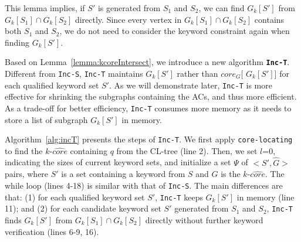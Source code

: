 This lemma implies, if $S'$ is generated from $S_1$ and $S_2$,
we can find $G_k[S']$ from $G_k[S_1]\cap G_k[S_2]$ directly.
Since every vertex in $G_k[S_1]\cap G_k[S_2]$ contains both $S_1$ and $S_2$,
we do not need to consider the keyword constraint again when finding $G_k[S']$.

Based on Lemma~\ref{lemma:kcoreIntersect}, we introduce a new algorithm \textbf{{\tt Inc-T}}. Different from {\tt Inc-S}, {\tt Inc-T} maintains $G_k[S']$ rather than $core_G[$ $G_k[S']]$ for each qualified keyword set $S'$. As we will demonstrate later, {\tt Inc-T} is more effective for shrinking the subgraphs containing the ACs, and thus more efficient. As a trade-off for better efficiency, {\tt Inc-T} consumes more memory as it needs to store a list of subgraph $G_k[S']$ in memory.


Algorithm~\ref{alg:incT} presents the steps of {\tt Inc-T}.
We first apply {\tt core-locating} to find the $k$-$\widehat{core}$ containing $q$ from the CL-tree (line 2).
Then, we set $l$=0, indicating the sizes of current keyword sets,
and initialize a set $\Psi$ of $<S',\widehat G>$ pairs,
where $S'$ is a set containing a keyword from $S$ and $\widehat G$ is the $k$-$\widehat {core}$.
The while loop (lines 4-18) is similar with that of {\tt Inc-S}.
The main differences are that:
(1) for each qualified keyword set $S'$, {\tt Inc-T} keeps $G_k[S']$ in memory (line 11);
and (2) for each candidate keyword set $S'$ generated from $S_1$ and $S_2$,
{\tt Inc-T} finds $G_k[S']$ from $G_k[S_1]\cap G_k[S_2]$ directly without further keyword verification (lines 6-9, 16).

